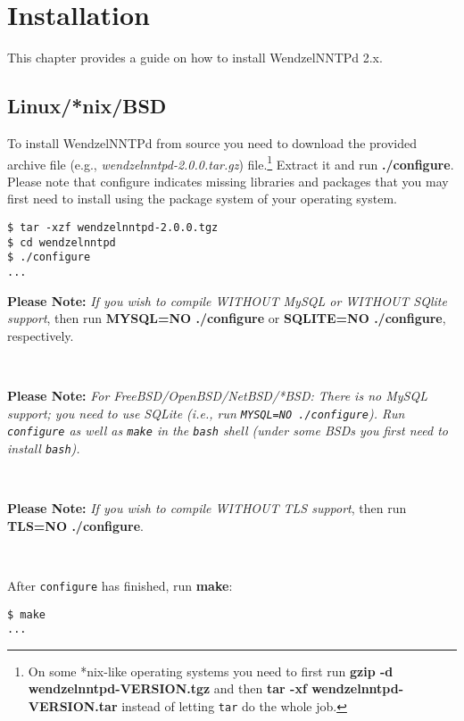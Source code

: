 \chapter{Installation}

This chapter provides a guide on how to install WendzelNNTPd 2.x.

\section{Linux/*nix/BSD}

To install WendzelNNTPd from source you need to download the provided archive file (e.g., \emph{wendzelnntpd-2.0.0.tar.gz}) file.\footnote{On some *nix-like operating systems you need to first run \textbf{gzip -d wendzelnntpd-VERSION.tgz} and then \textbf{tar -xf wendzelnntpd-VERSION.tar} instead of letting \texttt{tar} do the whole job.} Extract it and run \textbf{./configure}. Please note that configure indicates missing libraries and packages that you may first need to install using the package system of your operating system.

\begin{verbatim}
$ tar -xzf wendzelnntpd-2.0.0.tgz
$ cd wendzelnntpd
$ ./configure
...
\end{verbatim}

\textbf{Please Note:} \textit{If you wish to compile WITHOUT MySQL or WITHOUT SQlite support}, then run \textbf{MYSQL=NO ./configure} or \textbf{SQLITE=NO ./configure}, respectively.

~

\textbf{Please Note:} \textit{For FreeBSD/OpenBSD/NetBSD/*BSD: There is no MySQL support; you need to use SQLite (i.e., run \texttt{MYSQL=NO ./configure}). Run \texttt{configure} as well as \texttt{make} in the \texttt{bash} shell (under some BSDs you first need to install \texttt{bash}).}

~

\textbf{Please Note:} \textit{If you wish to compile WITHOUT TLS support}, then run \textbf{TLS=NO ./configure}.

~

After \texttt{configure} has finished, run \textbf{make}:

\begin{verbatim}
$ make
...
\end{verbatim}

